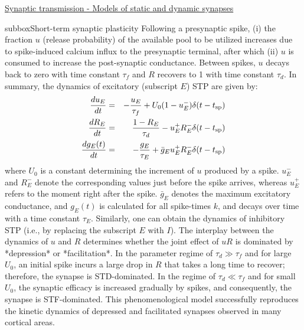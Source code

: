 \begin{textbox}{\href{https://compneuro.neuromatch.io/tutorials/W2D3_BiologicalNeuronModels/student/W2D3_Tutorial3.html}{Synaptic transmission - Models of static and dynamic synapses } }
\begin{subbox}{subbox}{Short-term synaptic plasticity}
Following a presynaptic spike, (i) the fraction $u$ (release probability) of the available pool to be utilized increases due to spike-induced calcium influx to the presynaptic terminal, after which (ii) $u$ is consumed to increase the post-synaptic conductance. Between spikes, $u$ decays back to zero with time constant $\tau_f$ and $R$ recovers to 1 with time constant $\tau_d$. In summary, the dynamics of excitatory (subscript $E$) STP are given by:
\begin{eqnarray*}
\frac{du_E}{dt} &=& -\frac{u_E}{\tau_f} + U_0(1-u_E^-)\delta(t-t_{\rm sp}) \\
\frac{dR_E}{dt} &=& \frac{1-R_E}{\tau_d} - u_E^+ R_E^- \delta(t-t_{\rm sp})  \\
\frac{dg_E(t)}{dt} &=& -\frac{g_E}{\tau_E} + \bar{g}_E u_E^+ R_E^- \delta(t-t_{\rm sp})
\end{eqnarray*}
where $U_0$ is a constant determining the increment of $u$ produced by a spike. $u_E^-$ and $R_E^-$ denote the corresponding values just before the spike arrives, whereas $u_E^+$ refers to the moment right after the spike. $\bar{g}_E$ denotes the maximum excitatory conductance, and $g_E(t)$ is calculated for all spike-times $k$, and decays over time with a time constant $\tau_{E}$. Similarly, one can obtain the dynamics of inhibitory STP (i.e., by replacing the subscript $E$ with $I$).
The interplay between the dynamics of $u$ and $R$ determines whether the joint effect of $uR$ is dominated by *depression* or *facilitation*. In the parameter regime of $\tau_d \gg \tau_f$  and for large $U_0$, an initial spike incurs a large drop in $R$ that takes a long time to recover; therefore, the synapse is STD-dominated. In the regime of $\tau_d \ll \tau_f$ and for small $U_0$, the synaptic efficacy is increased gradually by spikes, and consequently, the synapse is STF-dominated. This phenomenological model successfully reproduces the kinetic dynamics of depressed and facilitated synapses observed in many cortical areas.

\end{subbox}

\end{textbox}

